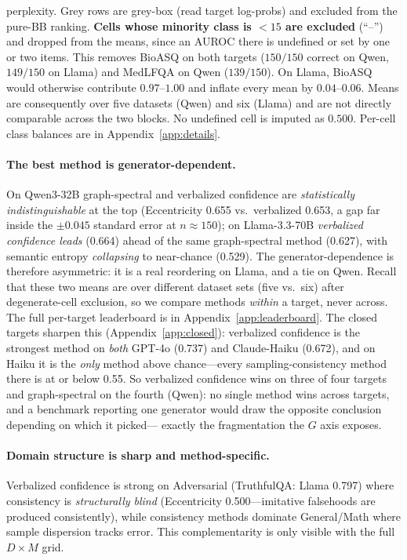 \documentclass[11pt]{article}
\begin{document}
\begin{table}[t]
{perplexity. Grey rows are grey-box (read target log-probs) and excluded from the pure-BB
ranking. \textbf{Cells whose minority class is $<15$ are excluded} (``--'') and dropped from the
means, since an AUROC there is undefined or set by one or two items. This removes BioASQ on both
targets ($150/150$ correct on Qwen, $149/150$ on Llama) and MedLFQA on Qwen ($139/150$). On
Llama, BioASQ would otherwise contribute $0.97$--$1.00$ and inflate every mean by $0.04$--$0.06$.
Means are consequently over five datasets (Qwen) and six (Llama) and are not directly
comparable across the two blocks. No undefined cell is imputed as $0.500$. Per-cell class
balances are in Appendix~\ref{app:details}.}
\label{tab:leaderboard}
\end{table}

\paragraph{The best method is generator-dependent.} On Qwen3-32B graph-spectral and verbalized
confidence are \emph{statistically indistinguishable} at the top (Eccentricity 0.655 vs.\
verbalized 0.653, a gap far inside the $\pm0.045$ standard error at $n{\approx}150$); on
Llama-3.3-70B \emph{verbalized confidence leads} (0.664) ahead of the same graph-spectral
method (0.627), with semantic entropy \emph{collapsing} to near-chance (0.529). The
generator-dependence is therefore asymmetric: it is a real reordering on Llama, and a tie on
Qwen. Recall that these two means are over different dataset sets (five vs.\ six) after
degenerate-cell exclusion, so we compare methods \emph{within} a target, never across. The full per-target leaderboard is in Appendix~\ref{app:leaderboard}. The closed targets
sharpen this (Appendix~\ref{app:closed}): verbalized
confidence is the strongest method on \emph{both} GPT-4o (0.737) and Claude-Haiku (0.672),
and on Haiku it is the \emph{only} method above chance---every sampling-consistency method
there is at or below 0.55. So verbalized confidence wins on three of four targets and
graph-spectral on the fourth (Qwen): no single method wins across targets, and a benchmark
reporting one generator would draw the opposite conclusion depending on which it picked---%
exactly the fragmentation the $G$ axis exposes.

\paragraph{Domain structure is sharp and method-specific.} Verbalized confidence is
strong on Adversarial (TruthfulQA: Llama 0.797) where consistency is
\emph{structurally blind} (Eccentricity 0.500---imitative falsehoods are produced
consistently), while consistency methods dominate General/Math where sample dispersion
tracks error. This complementarity is only visible with the full $D\times M$ grid.
\end{document}
